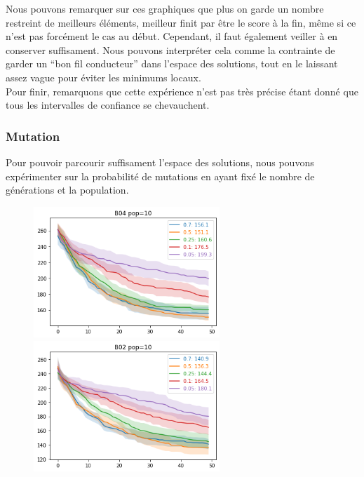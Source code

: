 \documentclass{article}
\begin{document}
Nous pouvons remarquer sur ces graphiques que plus on garde un nombre restreint de meilleurs éléments, meilleur finit par être le score à la fin, même si ce n'est pas forcément le cas au début.  Cependant, il faut également veiller à en conserver suffisament. Nous pouvons interpréter cela comme la contrainte de garder un ``bon fil conducteur'' dans l'espace des solutions, tout en le laissant assez vague pour éviter les minimums locaux.\\ 
Pour finir, remarquons que cette expérience n'est pas très précise étant donné que tous les intervalles de confiance se chevauchent.

\subsubsection{Mutation}
Pour pouvoir parcourir suffisament l'espace des solutions, nous pouvons expérimenter sur la probabilité de mutations en ayant fixé le nombre de générations et la population.

\begin{figure}[H]
	\centerline{ \includegraphics[width=7cm]{images/B04mut10.png} \includegraphics[width=7cm]{images/B02mut10.png} } 
\end{figure}
\end{document}

